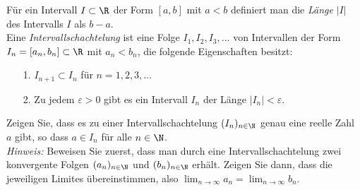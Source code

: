 
 Für ein Intervall $I\subset\R$ der Form $[a,b]$ mit $a<b$ definiert man die \textit{Länge} $|I|$ des Intervalls $I$ als $b-a$.\\
Eine \textit{Intervallschachtelung} ist eine Folge $I_1,I_2,I_3,\ldots$ von Intervallen der Form $I_n=[a_n,b_n]\subset\R$ mit $a_n<b_n$, die folgende Eigenschaften besitzt:
\begin{itemize}
	\item[1.] $I_{n+1}\subset I_n$ für $n=1,2,3,\ldots$
	\item[2.] Zu jedem $\varepsilon>0$ gibt es ein Intervall $I_n$ der Länge $|I_n|<\varepsilon$.
\end{itemize}
Zeigen Sie, dass es zu einer Intervallschachtelung $(I_n)_{n\in\N}$ genau eine reelle Zahl $a$ gibt, so dass $a\in I_n$ für alle $n\in\N$.\\

\textit{Hinweis:} Beweisen Sie zuerst, dass man durch eine Intervallschachtelung zwei konvergente Folgen $(a_n)_{n\in\N}$ und $(b_n)_{n\in\N}$ erhält. Zeigen Sie dann, dass die jeweiligen Limites übereinstimmen, also $\lim_{n\rightarrow\infty}a_n=\lim_{n\rightarrow\infty}b_n$.
